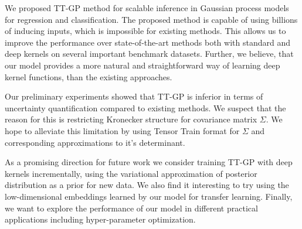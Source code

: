 We proposed TT-GP method for scalable inference in Gaussian process models
for regression and classification.  The proposed method is capable of using
billions of inducing inputs, which is impossible for existing methods. This allows us to improve the
performance over state-of-the-art methods both with standard and deep kernels
on several important benchmark datasets. Further, we believe, that our model provides a more natural and straightforward
way of learning deep kernel functions, than the existing approaches.

Our preliminary experiments showed that TT-GP is inferior in terms of
uncertainty quantification compared to existing methods. We suspect that the
reason for this is restricting Kronecker structure for covariance matrix $\Sigma$. We hope to
alleviate this limitation by using Tensor Train format for $\Sigma$ and corresponding approximations to it's determinant.

As a promising direction for future work we consider training TT-GP
with deep kernels incrementally, using the variational approximation
of posterior distribution as a prior for new data. We also find it interesting
to try using the low-dimensional embeddings learned by our model for transfer learning. Finally, we want to
explore the performance of our model in different practical applications including hyper-parameter optimization.
